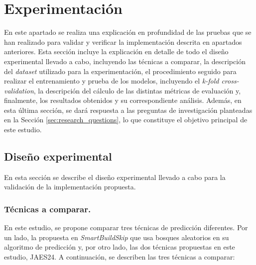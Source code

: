 \section{Experimentación}

En este apartado se realiza una explicación en profundidad de las pruebas que se han realizado
para validar y verificar la implementación descrita en apartados anteriores. Esta sección incluye
la explicación en detalle de todo el diseño experimental llevado a cabo, incluyendo las técnicas
a comparar, la descripción del \textit{dataset} utilizado para la experimentación, el
procedimiento seguido para realizar el entrenamiento y prueba de los modelos, incluyendo el
\textit{k-fold cross-validation}, la descripción del cálculo de las distintas métricas de
evaluación y, finalmente, los resultados obtenidos y su correspondiente análisis. Además, en esta
última sección, se dará respuesta a las preguntas de investigación planteadas en la Sección
\ref{sec:research_questions}, lo que constituye el objetivo principal de este estudio.

\subsection{Diseño experimental}
\noindent En esta sección se describe el diseño experimental llevado a cabo para la validación
de la implementación propuesta.

\subsubsection{Técnicas a comparar.}
En este estudio, se propone comparar tres técnicas de predicción diferentes. Por un lado, la
propuesta en \textit{SmartBuildSkip} \cite{2} que usa bosques aleatorios en su algoritmo de
predicción y, por otro lado, las dos técnicas propuestas en este estudio, JAES24. A continuación,
se describen las tres técnicas a comparar:

